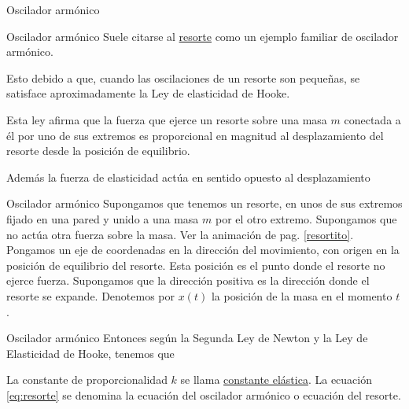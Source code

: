 \documentclass[handout,hyperref={colorlinks=true}]{beamer}
\begin{document}
\begin{frame}{Oscilador armónico}\label{resortito}

\begin{center}
\end{center}
 
\end{frame}

\begin{frame}{Oscilador armónico}
Suele citarse al \href{http://es.wikipedia.org/wiki/Resorte}{resorte} como un ejemplo familiar de oscilador armónico.

Esto debido a que, cuando las oscilaciones de un resorte son
pequeñas,  se satisface aproximadamente la Ley de elasticidad de  Hooke.

Esta ley  afirma que la fuerza que ejerce un resorte sobre una masa $m$ conectada a él por uno 
de sus extremos es proporcional en magnitud al desplazamiento
del resorte desde la posición de equilibrio.

Además la fuerza de elasticidad actúa en sentido opuesto al desplazamiento
 
\end{frame}


\begin{frame}{Oscilador armónico}
 Supongamos que tenemos un resorte, en unos de sus extremos fijado en una pared y unido a una masa $m$ por el otro extremo. Supongamos que no actúa otra fuerza 
 sobre la masa. Ver la animación de pag. \ref{resortito}.  Pongamos un eje de coordenadas en la dirección del movimiento, con origen en la posición de equilibrio 
 del resorte. Esta posición es el punto donde el resorte no ejerce fuerza. Supongamos que la dirección positiva es la dirección donde el resorte se expande. Denotemos 
 por $x(t)$ la posición de la masa en el momento $t$.  

\end{frame}
\begin{frame}{Oscilador armónico}
  Entonces según la Segunda Ley de Newton y la Ley de Elasticidad de Hooke, tenemos que
 
 
La constante de proporcionalidad $k$ se llama \href{http://es.wikipedia.org/wiki/Rigidez}{constante elástica}. La ecuación \eqref{eq:resorte} se denomina la
ecuación del oscilador armónico o ecuación del resorte.

\end{frame}
\end{document}
